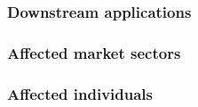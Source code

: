 \documentclass{article}
\begin{document}

\subsubsection{Downstream applications}


\subsubsection{Affected market sectors}



\subsubsection{Affected individuals}

\end{document}
